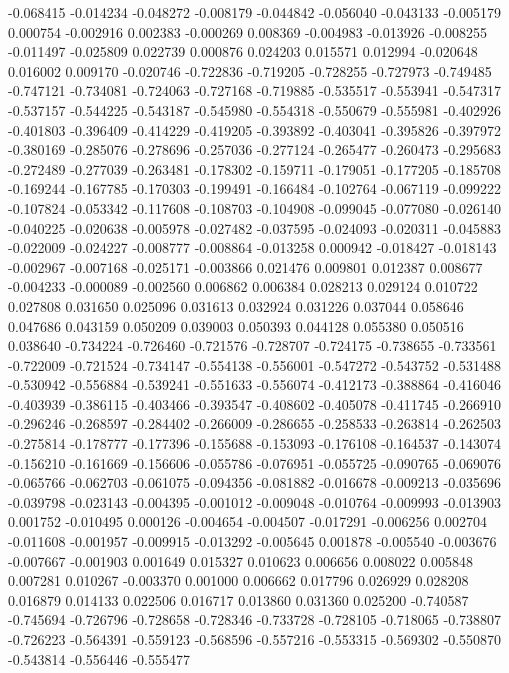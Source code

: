 -0.068415
-0.014234
-0.048272
-0.008179
-0.044842
-0.056040
-0.043133
-0.005179
0.000754
-0.002916
0.002383
-0.000269
0.008369
-0.004983
-0.013926
-0.008255
-0.011497
-0.025809
0.022739
0.000876
0.024203
0.015571
0.012994
-0.020648
0.016002
0.009170
-0.020746
-0.722836
-0.719205
-0.728255
-0.727973
-0.749485
-0.747121
-0.734081
-0.724063
-0.727168
-0.719885
-0.535517
-0.553941
-0.547317
-0.537157
-0.544225
-0.543187
-0.545980
-0.554318
-0.550679
-0.555981
-0.402926
-0.401803
-0.396409
-0.414229
-0.419205
-0.393892
-0.403041
-0.395826
-0.397972
-0.380169
-0.285076
-0.278696
-0.257036
-0.277124
-0.265477
-0.260473
-0.295683
-0.272489
-0.277039
-0.263481
-0.178302
-0.159711
-0.179051
-0.177205
-0.185708
-0.169244
-0.167785
-0.170303
-0.199491
-0.166484
-0.102764
-0.067119
-0.099222
-0.107824
-0.053342
-0.117608
-0.108703
-0.104908
-0.099045
-0.077080
-0.026140
-0.040225
-0.020638
-0.005978
-0.027482
-0.037595
-0.024093
-0.020311
-0.045883
-0.022009
-0.024227
-0.008777
-0.008864
-0.013258
0.000942
-0.018427
-0.018143
-0.002967
-0.007168
-0.025171
-0.003866
0.021476
0.009801
0.012387
0.008677
-0.004233
-0.000089
-0.002560
0.006862
0.006384
0.028213
0.029124
0.010722
0.027808
0.031650
0.025096
0.031613
0.032924
0.031226
0.037044
0.058646
0.047686
0.043159
0.050209
0.039003
0.050393
0.044128
0.055380
0.050516
0.038640
-0.734224
-0.726460
-0.721576
-0.728707
-0.724175
-0.738655
-0.733561
-0.722009
-0.721524
-0.734147
-0.554138
-0.556001
-0.547272
-0.543752
-0.531488
-0.530942
-0.556884
-0.539241
-0.551633
-0.556074
-0.412173
-0.388864
-0.416046
-0.403939
-0.386115
-0.403466
-0.393547
-0.408602
-0.405078
-0.411745
-0.266910
-0.296246
-0.268597
-0.284402
-0.266009
-0.286655
-0.258533
-0.263814
-0.262503
-0.275814
-0.178777
-0.177396
-0.155688
-0.153093
-0.176108
-0.164537
-0.143074
-0.156210
-0.161669
-0.156606
-0.055786
-0.076951
-0.055725
-0.090765
-0.069076
-0.065766
-0.062703
-0.061075
-0.094356
-0.081882
-0.016678
-0.009213
-0.035696
-0.039798
-0.023143
-0.004395
-0.001012
-0.009048
-0.010764
-0.009993
-0.013903
0.001752
-0.010495
0.000126
-0.004654
-0.004507
-0.017291
-0.006256
0.002704
-0.011608
-0.001957
-0.009915
-0.013292
-0.005645
0.001878
-0.005540
-0.003676
-0.007667
-0.001903
0.001649
0.015327
0.010623
0.006656
0.008022
0.005848
0.007281
0.010267
-0.003370
0.001000
0.006662
0.017796
0.026929
0.028208
0.016879
0.014133
0.022506
0.016717
0.013860
0.031360
0.025200
-0.740587
-0.745694
-0.726796
-0.728658
-0.728346
-0.733728
-0.728105
-0.718065
-0.738807
-0.726223
-0.564391
-0.559123
-0.568596
-0.557216
-0.553315
-0.569302
-0.550870
-0.543814
-0.556446
-0.555477
